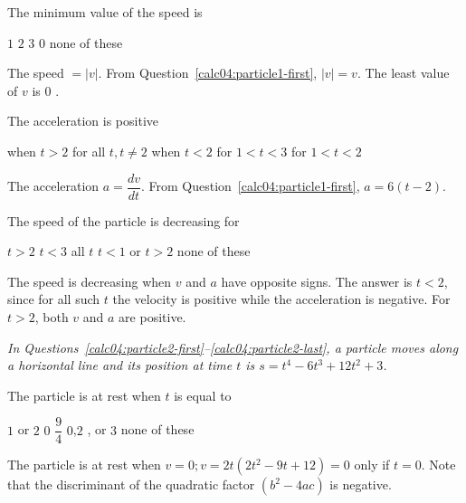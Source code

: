 \question
The minimum value of the speed is
\begin{choices}
  \choice $1$
  \choice $2$
  \choice $3$
  \CorrectChoice $0$
  \choice none of these
\end{choices}
\begin{solution}
The speed $=|v|$. From Question~\ref{calc04:particle1-first}, $|v|=v$. The least value of $v$ is 0 .
\end{solution}

\question
The acceleration is positive
\begin{choices}
  \CorrectChoice when $t>2$
  \choice for all $t, t \neq 2$
  \choice when $t<2$
  \choice for $1<t<3$
  \choice for $1<t<2$
\end{choices}
\begin{solution}
The acceleration $a=\dfrac{d v}{d t}$. From Question~\ref{calc04:particle1-first}, $a=6(t-2)$.
\end{solution}

\question\label{calc04:particle1-last}
The speed of the particle is decreasing for
\begin{choices}
  \choice $t>2$
  \choice $t<3$
  \choice all $t$
  \choice $t<1$ or $t>2$
  \CorrectChoice none of these
\end{choices}
\begin{solution}
The speed is decreasing when $v$ and $a$ have opposite signs. The answer is $t<2$, since for all such $t$ the velocity is positive while the acceleration is negative. For $t>2$, both $v$ and $a$ are positive.
\end{solution}





\newpage




\begin{EnvFullwidth}
\textit{In Questions~\ref{calc04:particle2-first}--\ref{calc04:particle2-last}, a particle moves along a horizontal line and its position at time $t$ is $s=t^{4}-6 t^{3}+12 t^{2}+3$.}
\end{EnvFullwidth}

\question\label{calc04:particle2-first}
The particle is at rest when $t$ is equal to
\begin{choices}
  \choice $1$ or $2$
  \CorrectChoice $0$
  \choice $\dfrac{9}{4}$
  \choice $0$,$2$ , or $3$
  \choice none of these
\end{choices}
\begin{solution}
The particle is at rest when $v=0 ; v=2 t\left(2 t^{2}-9 t+12\right)=0$ only if $t=0$. Note that the discriminant of the quadratic factor $\left(b^{2}-4 a c\right)$ is negative.
\end{solution}

